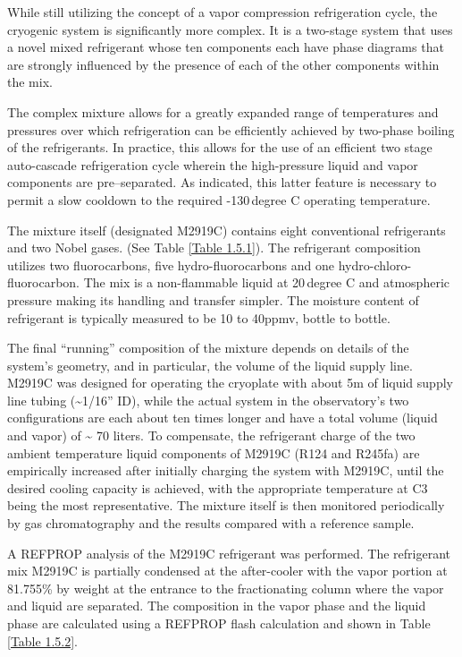 While still utilizing the concept of a vapor compression refrigeration cycle, the cryogenic system is significantly more complex. It is a two-stage system that uses a novel mixed refrigerant whose ten components each have phase diagrams that are strongly influenced by the presence of each of the other components within the mix.

The complex mixture allows for a greatly expanded range of temperatures and pressures over which refrigeration can be efficiently achieved by two-phase boiling of the refrigerants. In practice, this allows for the use of an efficient two stage auto-cascade refrigeration cycle wherein the high-pressure liquid and vapor components are pre--separated. As indicated, this latter feature is necessary to permit a slow cooldown to the required -130\,degree C operating temperature.

The mixture itself (designated M2919C) contains eight conventional refrigerants and two Nobel gases. (See Table \ref{Table 1.5.1}). The refrigerant composition utilizes two fluorocarbons, five hydro-fluorocarbons and one hydro-chloro-fluorocarbon. The mix is a non-flammable liquid at 20\,degree C and atmospheric pressure making its handling and transfer simpler. The moisture content of refrigerant is typically measured to be 10 to 40ppmv, bottle to bottle.

The final ``running'' composition of the mixture depends on details of the system's geometry, and in particular, the volume of the liquid supply line. M2919C was designed for operating the cryoplate with about 5m of liquid supply line tubing (\textasciitilde1/16'' ID), while the actual system in the observatory's two configurations are each about ten times longer and have a total volume (liquid and vapor) of \textasciitilde{} 70 liters. To compensate, the refrigerant charge of the two ambient temperature liquid components of M2919C (R124 and R245fa) are empirically increased after initially charging the system with M2919C, until the desired cooling capacity is achieved, with the appropriate temperature at C3 being the most representative. The mixture itself is then monitored periodically by gas chromatography and the results compared with a reference sample.

A REFPROP analysis of the M2919C refrigerant was performed. The refrigerant mix M2919C is partially condensed at the after-cooler with the vapor portion at 81.755\% by weight at the entrance to the fractionating column where the vapor and liquid are separated. The composition in the vapor phase and the liquid phase are calculated using a REFPROP flash calculation and shown in Table \ref{Table 1.5.2}.

